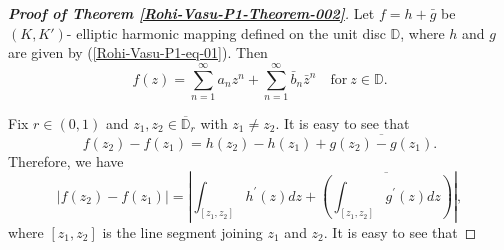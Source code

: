 \documentclass[a4paper,12pt]{amsart}
\theoremstyle{plain}
\theoremstyle{definition}
\begin{document}
\begin{proof}[{\bf Proof of Theorem   \ref{Rohi-Vasu-P1-Theorem-002}}]
Let $f=h+\bar{g}$ be $(K,K')$- elliptic harmonic mapping defined on the unit disc $\mathbb{D}$, where $h$ and $g$ are given by (\ref{Rohi-Vasu-P1-eq-01}). Then
 $$
 f(z)=\sum_{n=1}^{\infty} a_n z^n+\sum_{n=1}^{\infty} \bar{b}_n \bar{z}^n \quad \text{for} \ z \in \mathbb{D} .
$$

Fix $r \in(0,1)$ and $z_1,z_2 \in \overline{\mathbb{D}}_r$ with $z_1 \neq z_2$.
It is easy to see that
$$
f\left(z_2\right)-f\left(z_1\right)=h\left(z_2\right)-h\left(z_1\right)+\overline{g\left(z_2\right)-g\left(z_1\right)}. $$
Therefore, we have
$$
|f(z_2)-f(z_1)|=\left|\int_{[z_1, z_2]} h^{\prime}(z) d z+\overline{\left(\int_{[z_1, z_2]} g^{\prime}(z) d z\right)}\right|,
$$
where $[z_1, z_2]$ is the line segment joining $z_1$ and $z_2$. It is easy to see that


\end{proof}
\end{document}

